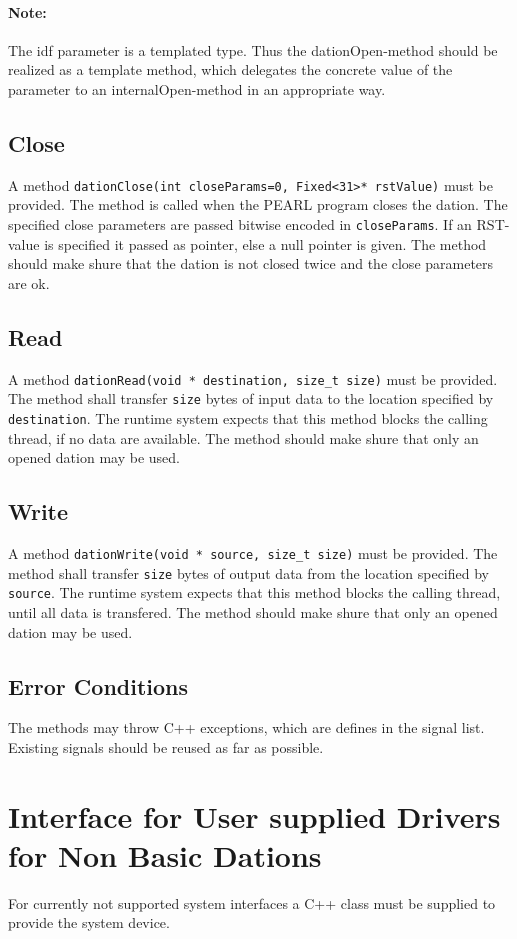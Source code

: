 \paragraph{Note:} The idf parameter is a templated type.
 Thus the dationOpen-method should be realized as a template method,
 which delegates the concrete value of the parameter to an
 internalOpen-method in an appropriate way.

\subsection{Close}
A method \verb|dationClose(int closeParams=0, Fixed<31>* rstValue)|
must be provided.
The method is called when the PEARL program closes the dation.
The specified close parameters are passed bitwise encoded in \verb|closeParams|.
If an RST-value is specified it passed as pointer, else
a null pointer is given.
The method should make shure that the dation is not closed twice and
the close parameters are ok.

\subsection{Read}
A method \verb|dationRead(void * destination, size_t size)|
must be provided. The method shall transfer \verb|size| bytes of
input data to the location specified by \verb|destination|.
The runtime system expects that this method blocks the calling thread,
if no data are available.
The method should make shure that only an opened dation may be used.

\subsection{Write}
A method \verb|dationWrite(void * source, size_t size)|
must be provided. The method shall transfer \verb|size| bytes of
output data from the location specified by \verb|source|.
The runtime system expects that this method blocks the calling thread,
until all data is transfered.
The method should make shure that only an opened dation may be used.

\subsection{Error Conditions}
The methods may throw C++ exceptions, which are defines in the signal list.
Existing signals should be reused as far as possible.

\section{Interface for User supplied Drivers for Non Basic Dations}
For currently not supported system interfaces a C++ class must be supplied to 
provide the system device.

